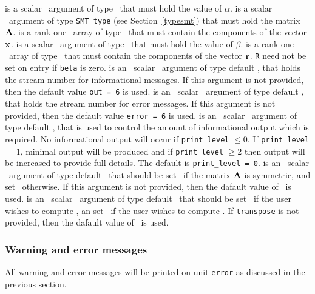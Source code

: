 \documentclass{galahad}
\begin{document}
\begin{description}
   is a scalar \intentin\ argument of type \realdp\ that
     must hold the value of $\alpha$.
   is a scalar \intentin\ argument of type {\tt SMT\_type} (see
     Section~\ref{typesmt}) that must hold the matrix ${\mathbf{A}}$.
   is a rank-one \intentin\ array of type \realdp\ that must
     contain the components of the vector ${\mathbf{x}}$.
   is a scalar \intentin\ argument of type \realdp\ that
     must hold the value of $\beta$.
   is a rank-one \intentinout\ array of type \realdp\ that must
  contain the components of the vector ${\mathbf{r}}$. {\tt R} need not be set
  on entry if {\tt beta} is zero.
   is an \optional\ scalar \intentin\ argument of type default \integer, that holds the
     stream number for informational messages. If this argument is not
     provided, then the default value {\tt out = 6} is used.
   is an \optional\ scalar \intentin\ argument of type default \integer, that holds the
     stream number for error messages. If this argument is not
     provided, then the default value {\tt error = 6} is used.
   is an \optional\ scalar \intentin\ argument of type default \integer, that is used
     to control the amount of informational output which is required. No
     informational output will occur if {\tt print\_level} $\leq 0$. If
     {\tt print\_level} $= 1$, minimal output will be produced and if
     {\tt print\_level} $\geq 2$ then output will be
     increased to provide full details.
     The default is {\tt print\_level = 0}.
   is an \optional\ scalar \intentin\ argument of type default
     \logical\ that should be set \true\ if the matrix ${\mathbf{A}}$ is
     symmetric, and set \false\ otherwise.  If this argument is not
     provided, then the dafault value of \false\ is used.
   is an \optional\ scalar \intentin\ argument of type default
     \logical\ that should be set \false\ if the user wishes to compute
     , an set \true\ if the user wishes to compute .
     If {\tt transpose} is not provided, then the dafault value of
     \false\ is used.
\end{description}

\subsubsection{Warning and error messages}\label{Ax-error}

All warning and error messages will be printed on unit {\tt error} as
discussed in the previous section.
\end{document}
